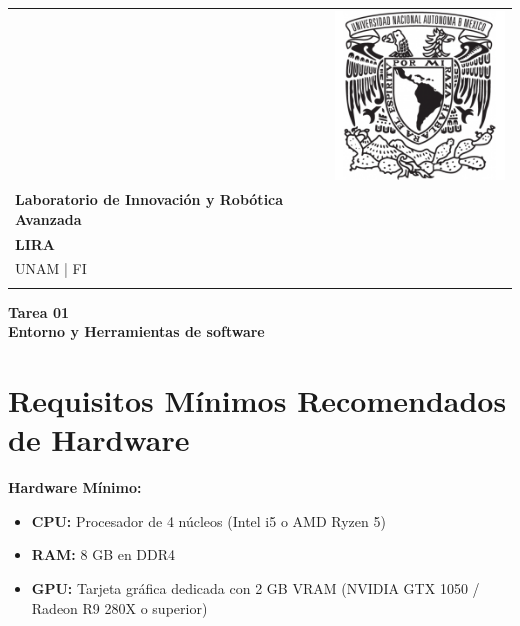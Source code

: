 \documentclass[letter,11pt]{article} %
\begin{document}
	\thispagestyle{empty} %
	
	\begin{tabular} {p{14cm} p{3cm}}
		&  \multirow{3.5}{*}{\includegraphics[scale=0.35]{Imagenes/UNAM_logo}}\\
		{\large \bf Laboratorio de Innovación y Robótica Avanzada} & \\
		{\large \bf LIRA} & \\
		UNAM | FI & \\
		&  \\
		\hline
	\end{tabular} 
	
	\vspace*{0.3cm} 
	
	\begin{center}
		{\Large \bf Tarea 01} \\
		{\bf {\normalsize Entorno y Herramientas de software}} \\
		\vspace{2mm} 
	\end{center}
	
	
	\section{Requisitos Mínimos Recomendados de Hardware}
	
	\textbf{Hardware Mínimo:}
	
	\begin{itemize}
		\item \textbf{CPU:} Procesador de 4 núcleos (Intel i5 o AMD Ryzen 5)
		\item \textbf{RAM:} 8 GB en DDR4
		\item \textbf{GPU:} Tarjeta gráfica dedicada con 2 GB VRAM (NVIDIA GTX 1050 / Radeon R9 280X o superior)
	\end{itemize}
	
\end{document}
